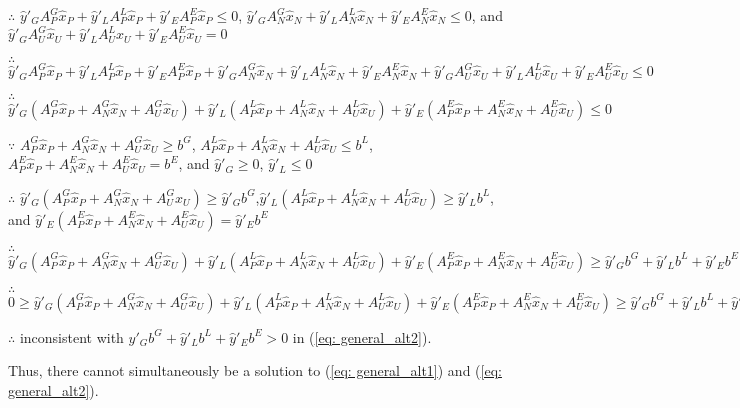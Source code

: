 $\therefore $ $\widehat{y}'_GA^G_P\widehat{x}_P + \widehat{y}'_LA^L_P\widehat{x}_P + \widehat{y}'_EA^E_P\widehat{x}_P \leq 0$, $\widehat{y}'_GA^G_N\widehat{x}_N + \widehat{y}'_LA^L_N\widehat{x}_N + \widehat{y}'_EA^E_N\widehat{x}_N \leq 0$, and $\widehat{y}'_GA^G_U\widehat{x}_U + \widehat{y}'_LA^L_U\widehat{x}_U + \widehat{y}'_EA^E_U\widehat{x}_U = 0$

$\therefore $ $\widehat{y}'_GA^G_P\widehat{x}_P + \widehat{y}'_LA^L_P\widehat{x}_P + \widehat{y}'_EA^E_P\widehat{x}_P + \widehat{y}'_GA^G_N\widehat{x}_N + \widehat{y}'_LA^L_N\widehat{x}_N + \widehat{y}'_EA^E_N\widehat{x}_N +\widehat{y}'_GA^G_U\widehat{x}_U + \widehat{y}'_LA^L_U\widehat{x}_U + \widehat{y}'_EA^E_U\widehat{x}_U \leq{} 0$

$\therefore $ $\widehat{y}'_G(A^G_P\widehat{x}_P+A^G_N\widehat{x}_N+A^G_U\widehat{x}_U) + \widehat{y}'_L(A^L_P\widehat{x}_P+A^L_N\widehat{x}_N+A^L_U\widehat{x}_U) + \widehat{y}'_E(A^E_P\widehat{x}_P+A^E_N\widehat{x}_N+A^E_U\widehat{x}_U) \leq{} 0$

$\because $ $A^G_P\widehat{x}_P + A^G_N\widehat{x}_N + A^G_U\widehat{x}_U \geq b^G$, $A^L_P\widehat{x}_P + A^L_N\widehat{x}_N + A^L_U\widehat{x}_U \leq b^L$, $A^E_P\widehat{x}_P + A^E_N\widehat{x}_N + A^E_U\widehat{x}_U = b^E$, and $\widehat{y}'_G\geq0$, $\widehat{y}'_L\leq0$

$\therefore $ $\widehat{y}'_G(A^G_P\widehat{x}_P+A^G_N\widehat{x}_N+A^G_U\widehat{x}_U)  \geq \widehat{y}'_Gb^G$,$\widehat{y}'_L(A^L_P\widehat{x}_P+A^L_N\widehat{x}_N+A^L_U\widehat{x}_U) \geq \widehat{y}'_Lb^L$, and $\widehat{y}'_E(A^E_P\widehat{x}_P+A^E_N\widehat{x}_N+A^E_U\widehat{x}_U) =\widehat{y}'_Eb^E$

$\therefore $ $\widehat{y}'_G(A^G_P\widehat{x}_P+A^G_N\widehat{x}_N+A^G_U\widehat{x}_U) +\widehat{y}'_L(A^L_P\widehat{x}_P+A^L_N\widehat{x}_N+A^L_U\widehat{x}_U)+\widehat{y}'_E(A^E_P\widehat{x}_P+A^E_N\widehat{x}_N+A^E_U\widehat{x}_U)  \geq \widehat{y}'_Gb^G+\widehat{y}'_Lb^L+\widehat{y}'_Eb^E$

$\therefore $ $0\geq{}\widehat{y}'_G(A^G_P\widehat{x}_P+A^G_N\widehat{x}_N+A^G_U\widehat{x}_U) +\widehat{y}'_L(A^L_P\widehat{x}_P+A^L_N\widehat{x}_N+A^L_U\widehat{x}_U)+\widehat{y}'_E(A^E_P\widehat{x}_P+A^E_N\widehat{x}_N+A^E_U\widehat{x}_U)  \geq \widehat{y}'_Gb^G+\widehat{y}'_Lb^L+\widehat{y}'_Eb^E$

$\therefore $ inconsistent with $\widehat{y}'_Gb^G+\widehat{y}'_Lb^L+\widehat{y}'_Eb^E>0$ in (\ref{eq: general_alt2}).

Thus, there cannot simultaneously be a solution to (\ref{eq: general_alt1}) and  (\ref{eq: general_alt2}).

